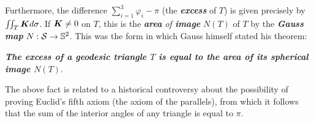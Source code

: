 \documentclass[11pt]{article}
\begin{document}
\begin{itemize}
\begin{remark}
Furthermore, the difference $\sum_{i=1}^{3}\varphi_{i} - \pi$ (the \emph{\textbf{excess}} of $T$) is given precisely  by $\iint_{T}\boldsymbol{K}d\sigma$. If $\boldsymbol{K} \neq 0$ on $T$, this is the \emph{\textbf{area} of \textbf{image}} $N(T)$ of $T$ by the \emph{\textbf{Gauss map}} $N: {\mathcal S} \rightarrow {\mathbb S}^2$. This was the form in which Gauss himself stated his theorem: 

\emph{\textbf{The excess of a geodesic triangle $T$ is equal to the area of its spherical image $N(T)$}}.

The above fact is related to a historical controversy about the possibility of proving Euclid’s fifth axiom (the axiom of the parallels), from which it follows that the sum of the interior angles of any triangle is equal to $\pi$. 
\end{remark} 
\end{itemize}

\newpage
\end{document}
